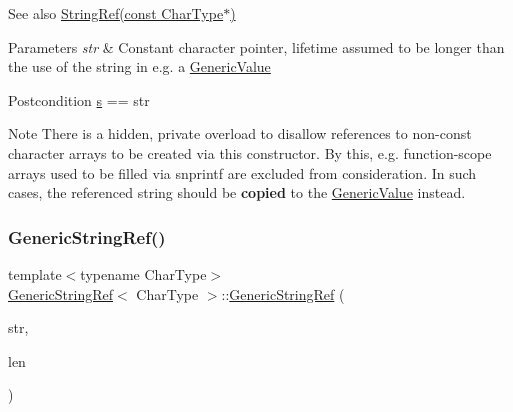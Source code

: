 \begin{DoxySeeAlso}{See also}
\hyperlink{structGenericStringRef_aa6b9fd9f6aa49405a574c362ba9af6b5}{String\+Ref(const Char\+Type$\ast$)}
\end{DoxySeeAlso}

\begin{DoxyParams}{Parameters}
{\em str} & Constant character pointer, lifetime assumed to be longer than the use of the string in e.\+g. a \hyperlink{classGenericValue}{Generic\+Value}\\
\hline
\end{DoxyParams}
\begin{DoxyPostcond}{Postcondition}
\hyperlink{structGenericStringRef_aec7a5900ea6f3e42f0ea8403d5135103}{s} == str
\end{DoxyPostcond}
\begin{DoxyNote}{Note}
There is a hidden, private overload to disallow references to non-\/const character arrays to be created via this constructor. By this, e.\+g. function-\/scope arrays used to be filled via {\ttfamily snprintf} are excluded from consideration. In such cases, the referenced string should be {\bfseries copied} to the \hyperlink{classGenericValue}{Generic\+Value} instead. 
\end{DoxyNote}
\mbox{\label{structGenericStringRef_a8b2c6a7fdc4da1e7055f7fdcf0ac517f}} 
\subsubsection{\texorpdfstring{Generic\+String\+Ref()}{GenericStringRef()}\hspace{0.1cm}{\footnotesize\ttfamily [3/6]}}
{\footnotesize\ttfamily template$<$typename Char\+Type$>$ \\
\hyperlink{structGenericStringRef}{Generic\+String\+Ref}$<$ Char\+Type $>$\+::\hyperlink{structGenericStringRef}{Generic\+String\+Ref} (\begin{DoxyParamCaption}\item[{const Char\+Type $\ast$}]{str,  }\item[{Size\+Type}]{len }\end{DoxyParamCaption})\hspace{0.3cm}{\ttfamily [inline]}}



